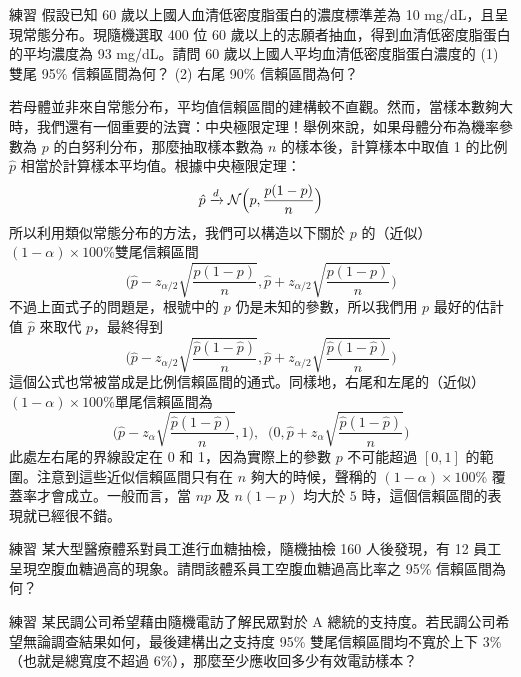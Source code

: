     \bigskip

    \begin{custom}{練習}
        假設已知 60 歲以上國人血清低密度脂蛋白的濃度標準差為 10 mg/dL，且呈現常態分布。現隨機選取 400 位 60 歲以上的志願者抽血，得到血清低密度脂蛋白的平均濃度為 93 mg/dL。請問 60 歲以上國人平均血清低密度脂蛋白濃度的 (1) 雙尾 95\% 信賴區間為何？ (2) 右尾 90\% 信賴區間為何？
    \end{custom}

    \bigskip

    若母體並非來自常態分布，平均值信賴區間的建構較不直觀。然而，當樣本數夠大時，我們還有一個重要的法寶：中央極限定理！舉例來說，如果母體分布為機率參數為 $p$ 的白努利分布，那麼抽取樣本數為 $n$ 的樣本後，計算樣本中取值 1 的比例 $\hat{p}$ 相當於計算樣本平均值。根據中央極限定理：
    \[\hat{p} \xrightarrow{d} \mathcal{N}\Big(p, \frac{p(1-p)}{n}\Big)\]
    所以利用類似常態分布的方法，我們可以構造以下關於 $p$ 的（近似） $(1-\alpha)\times 100\%$雙尾信賴區間
    \[\Big(\hat{p} - z_{\alpha/2} \sqrt{\frac{p(1-p)}{n}}, \hat{p} + z_{\alpha/2} \sqrt{\frac{p(1-p)}{n}}\Big)\]
    不過上面式子的問題是，根號中的 $p$ 仍是未知的參數，所以我們用 $p$ 最好的估計值 $\hat{p}$ 來取代 $p$，最終得到
    \[\Big(\hat{p} - z_{\alpha/2} \sqrt{\frac{\hat{p}(1-\hat{p})}{n}}, \hat{p} + z_{\alpha/2} \sqrt{\frac{\hat{p}(1-\hat{p})}{n}}\Big)\]
    這個公式也常被當成是比例信賴區間的通式。同樣地，右尾和左尾的（近似） $(1-\alpha)\times 100\%$單尾信賴區間為
    \[\Big(\hat{p} - z_{\alpha} \sqrt{\frac{\hat{p}(1-\hat{p})}{n}}, 1\Big), \;\; \Big(0, \hat{p} + z_{\alpha} \sqrt{\frac{\hat{p}(1-\hat{p})}{n}}\Big)\]
    此處左右尾的界線設定在 0 和 1，因為實際上的參數 $p$ 不可能超過 $[0,1]$ 的範圍。注意到這些近似信賴區間只有在 $n$ 夠大的時候，聲稱的 $(1-\alpha)\times 100\%$ 覆蓋率才會成立。一般而言，當 $np$ 及 $n(1-p)$ 均大於 $5$ 時，這個信賴區間的表現就已經很不錯。

    \bigskip
    
    \begin{custom}{練習}
        某大型醫療體系對員工進行血糖抽檢，隨機抽檢 160 人後發現，有 12 員工呈現空腹血糖過高的現象。請問該體系員工空腹血糖過高比率之 95\% 信賴區間為何？
    \end{custom}

    \bigskip

    \begin{custom}{練習}
        某民調公司希望藉由隨機電訪了解民眾對於 A 總統的支持度。若民調公司希望無論調查結果如何，最後建構出之支持度 95\% 雙尾信賴區間均不寬於上下 3\% （也就是總寬度不超過 6\%），那麼至少應收回多少有效電訪樣本？
    \end{custom}

